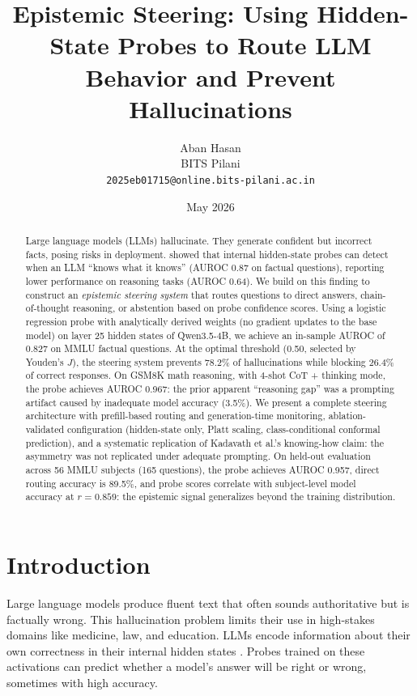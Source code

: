 \documentclass{article}
\title{Epistemic Steering: Using Hidden-State Probes to Route LLM Behavior and Prevent Hallucinations\github}
\author{Aban Hasan \\ BITS Pilani \\ \texttt{2025eb01715@online.bits-pilani.ac.in}}
\date{May 2026}
\begin{document}
\maketitle

\begin{abstract}
Large language models (LLMs) hallucinate. They generate confident but incorrect facts, posing risks in deployment. \citet{kadavath2022language} showed that internal hidden-state probes can detect when an LLM ``knows what it knows'' (AUROC 0.87 on factual questions), reporting lower performance on reasoning tasks (AUROC 0.64). We build on this finding to construct an \emph{epistemic steering system} that routes questions to direct answers, chain-of-thought reasoning, or abstention based on probe confidence scores. Using a logistic regression probe with analytically derived weights (no gradient updates to the base model) on layer 25 hidden states of Qwen3.5-4B, we achieve an in-sample AUROC of 0.827 on MMLU factual questions. At the optimal threshold (0.50, selected by Youden's $J$), the steering system prevents 78.2\% of hallucinations while blocking 26.4\% of correct responses. On GSM8K math reasoning, with 4-shot CoT + thinking mode, the probe achieves AUROC 0.967: the prior apparent ``reasoning gap'' was a prompting artifact caused by inadequate model accuracy (3.5\%). We present a complete steering architecture with prefill-based routing and generation-time monitoring, ablation-validated configuration (hidden-state only, Platt scaling, class-conditional conformal prediction), and a systematic replication of Kadavath et al.'s knowing-how claim: the asymmetry was not replicated under adequate prompting. On held-out evaluation across 56 MMLU subjects (165 questions), the probe achieves AUROC 0.957, direct routing accuracy is 89.5\%, and probe scores correlate with subject-level model accuracy at $r{=}0.859$: the epistemic signal generalizes beyond the training distribution.
\end{abstract}

\section{Introduction}

Large language models produce fluent text that often sounds authoritative but is factually wrong. This hallucination problem limits their use in high-stakes domains like medicine, law, and education. LLMs encode information about their own correctness in their internal hidden states \citep{kadavath2022language,azaria2023internal}. Probes trained on these activations can predict whether a model's answer will be right or wrong, sometimes with high accuracy.
\end{document}
